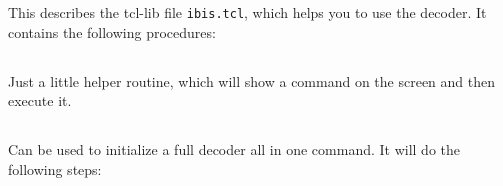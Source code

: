 
\section{}

This describes the tcl-lib  file \texttt{ibis.tcl}, which helps you to
use the  decoder. It contains the following procedures:

\subsection{}

Just a little helper routine, which will show a command on the screen and
then execute it.

\subsection{}

Can be used to initialize a full decoder all in one command. It will do
the following steps:

